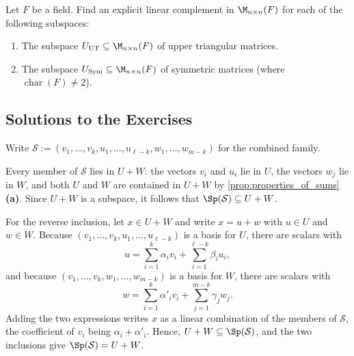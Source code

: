 \begin{exercise}
\label{exc:linear_complements_matrix_subspaces}
Let $F$ be a field. Find an explicit linear complement in $\M_{n \times n}(F)$ for each of the following subspaces:
\begin{enumerate}
    \item The subspace $U_{\mathrm{UT}} \subseteq \M_{n \times n}(F)$ of upper triangular matrices.
    \item The subspace $U_{\mathrm{Sym}} \subseteq \M_{n \times n}(F)$ of symmetric matrices (where $\operatorname{char}(F) \ne 2$).
\end{enumerate}
\end{exercise}

\subsection{Solutions to the Exercises}

\begin{exercisesolution}
\label{sol:combined_family_spans}
Write $\mathcal{S} := (v_1, \dots, v_k, u_1, \dots, u_{\ell-k}, w_1, \dots, w_{m-k})$ for the combined family.

Every member of $\mathcal{S}$ lies in $U + W$: the vectors $v_i$ and $u_i$ lie in $U$, the vectors $w_j$ lie in $W$, and both $U$ and $W$ are contained in $U + W$ by \cref{prop:properties_of_sums} \textbf{(a)}. Since $U + W$ is a subspace, it follows that $\Sp(\mathcal{S}) \subseteq U + W$.

For the reverse inclusion, let $x \in U + W$ and write $x = u + w$ with $u \in U$ and $w \in W$. Because $(v_1, \dots, v_k, u_1, \dots, u_{\ell-k})$ is a basis for $U$, there are scalars with
\[
u = \sum_{i=1}^{k} \alpha_i v_i + \sum_{i=1}^{\ell-k} \beta_i u_i,
\]
and because $(v_1, \dots, v_k, w_1, \dots, w_{m-k})$ is a basis for $W$, there are scalars with
\[
w = \sum_{i=1}^{k} \alpha'_i v_i + \sum_{j=1}^{m-k} \gamma_j w_j.
\]
Adding the two expressions writes $x$ as a linear combination of the members of $\mathcal{S}$, the coefficient of $v_i$ being $\alpha_i + \alpha'_i$. Hence, $U + W \subseteq \Sp(\mathcal{S})$, and the two inclusions give $\Sp(\mathcal{S}) = U + W$.
\end{exercisesolution}

